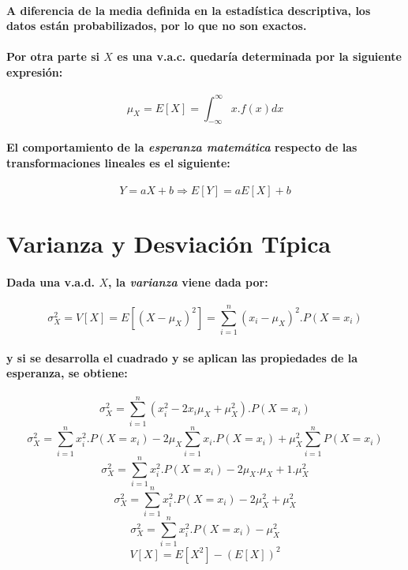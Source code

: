 \paragraph{
A diferencia de la media definida en la estadística descriptiva, los datos están probabilizados, por lo que no son exactos.
}
\paragraph{
Por otra parte si $X$ es una v.a.c. quedaría determinada por la siguiente expresión:
}
\begin{equation}
\mu_X = E[X] = \int_{-\infty}^\infty x . f(x) dx
\end{equation}
\paragraph{
El comportamiento de la \emph{esperanza matemática} respecto de las transformaciones lineales es el siguiente:
}
\begin{equation}
Y = a X + b \Rightarrow E[Y] = a E[X] + b
\end{equation}



\section{Varianza y Desviación Típica}
\paragraph{
Dada una v.a.d. $X$, la \emph{varianza} viene dada por:
}
\begin{equation}
\sigma_X^2 = V[X] = E[(X - \mu_X)^2] = \sum_{i=1}^n(x_i - \mu_X)^2.P(X=x_i)
\end{equation}
\paragraph{
y si se desarrolla el cuadrado y se aplican las propiedades de la esperanza, se obtiene:
}
\begin{equation}
\sigma_X^2 = \sum_{i=1}^n(x_i^2 - 2 x_i \mu_X + \mu_X^2).P(X=x_i)
\end{equation}
\begin{equation}
\sigma_X^2 = \sum_{i=1}^n x_i^2.P(X=x_i) - 2 \mu_X \sum_{i=1}^n x_i.P(X=x_i) + \mu_X^2 \sum_{i=1}^nP(X=x_i)
\end{equation}
\begin{equation}
\sigma_X^2 = \sum_{i=1}^n x_i^2.P(X=x_i) - 2 \mu_X . \mu_X + 1 . \mu_X^2
\end{equation}
\begin{equation}
\sigma_X^2 = \sum_{i=1}^n x_i^2.P(X=x_i) - 2 \mu_X^2 + \mu_X^2
\end{equation}
\begin{equation}
\sigma_X^2 = \sum_{i=1}^n x_i^2.P(X=x_i) - \mu_X^2
\end{equation}
\begin{equation}
V[X] = E[X^2] - (E[X])^2
\end{equation}
